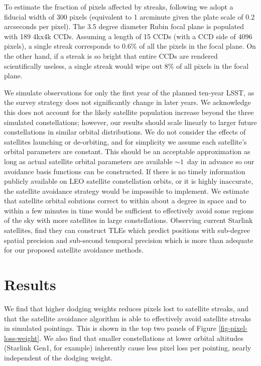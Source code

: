 \documentclass[twocolumn]{aastex631}
\begin{document}
To estimate the fraction of pixels affected by streaks, following \citet{hasan22} we adopt a fiducial width of 300 pixels (equivalent to 1 arcminute given the plate scale of 0.2 arcseconds per pixel). The 3.5 degree diameter Rubin focal plane is populated with 189 4kx4k CCDs. Assuming a length of 15 CCDs (with a CCD side of 4096 pixels), a single streak corresponds to 0.6\% of all the pixels in the focal plane. On the other hand, if a streak is so bright that entire CCDs are rendered scientifically useless, a single streak would wipe out 8\% of all pixels in the focal plane. 

We simulate observations for only the first year of the planned ten-year LSST, as the survey strategy does not significantly change in later years. We acknowledge this does not account for the likely satellite population increase beyond the three simulated constellations; however, our results should scale linearly to larger future constellations in similar orbital distributions. We do not consider the effects of satellites launching or de-orbiting, and for simplicity we assume each satellite's orbital parameters are constant. This should be an acceptable approximation as long as actual satellite orbital parameters are available $\sim1$\ day in advance so our avoidance basis functions can be constructed. If there is no timely information publicly available on LEO satellite constellation orbits, or it is highly inaccurate, the satellite avoidance strategy would be impossible to implement. We estimate that satellite orbital solutions correct to within about a degree in space and to within a few minutes in time would be sufficient to effectively avoid some regions of the sky with more satellites in large constellations. Observing current Starlink satellites, \citet{Halferty2022} find they can construct TLEs which predict positions with sub-degree spatial precision and sub-second temporal precision which is more than adequate for our proposed satellite avoidance methods.


\section{Results}\label{results}

We find that higher dodging weights reduces pixels lost to satellite streaks, and that the satellite avoidance algorithm is able to effectively avoid satellite streaks in simulated pointings. This is shown in the top two panels of Figure \ref{fig-pixel-loss-weight}. We also find that smaller constellations at lower orbital altitudes (Starlink Gen1, for example) inherently cause less pixel loss per pointing, nearly independent of the dodging weight.
\end{document}
